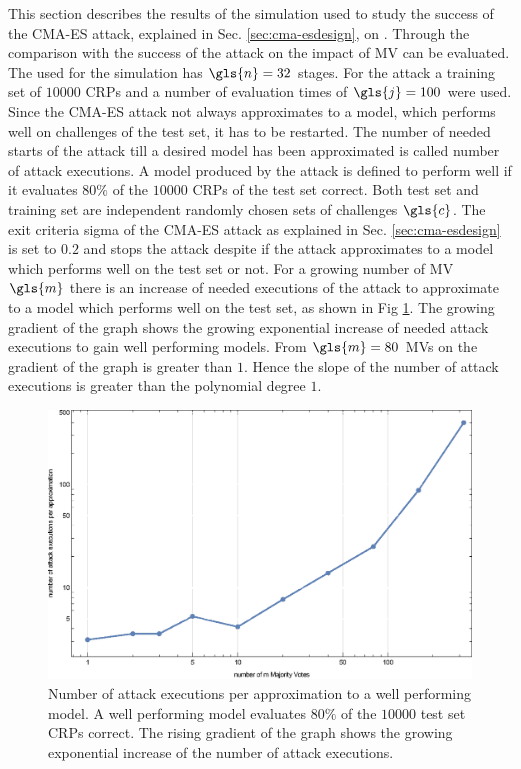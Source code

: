 This section describes the results of the simulation used to study the success of the \ac{CMA-ES} attack, explained in Sec. \ref{sec:cma-esdesign}, on \mpufs.
Through the comparison with the success of the attack on \apuf the impact of \ac{MV} can be evaluated.
The \apuf used for the simulation has $\gls{n} = 32$ stages.
For the attack a training set of $10000$ \acp{CRP} and a number of evaluation times of $\gls{j} = 100$ were used.
Since the \ac{CMA-ES} attack not always approximates to a model, which performs well on challenges of the test set, it has to be restarted.
The number of needed starts of the attack till a desired model has been approximated is called number of attack executions.
A model produced by the attack is defined to perform well if it evaluates $80 \%$ of the $10000$ \acp{CRP} of the test set correct.
Both test set and training set are independent randomly chosen sets of challenges $\gls{c}$.
The exit criteria sigma of the \ac{CMA-ES} attack as explained in Sec. \ref{sec:cma-esdesign} is set to $0.2$ and stops the attack despite if the attack approximates to a model which performs well on the test set or not.
For a growing number of \ac{MV} $\gls{m}$ there is an increase of needed executions of the attack to approximate to a model which performs well on the test set, as shown in Fig \ref{fig:cmasingleattackcorrelation}.
The growing gradient of the graph shows the growing exponential increase of needed attack executions to gain well performing models.
From $\gls{m} = 80$ \acp{MV} on the gradient of the graph is greater than $1$.
Hence the slope of the number of attack executions is greater than the polynomial degree $1$.

\begin{figure}[ht]
\includegraphics[width=1.00\textwidth]{images/single-mv-classification-cma-attack-correlation.eps}
\caption[Needed \acs{CMA-ES} attack executions for \mpufs]{Number of attack executions per approximation to a well performing model. A well performing model evaluates $80 \%$ of the $10000$ test set \acp{CRP} correct. The rising gradient of the graph shows the growing exponential increase of the number of attack executions.}
\label{fig:cmasingleattackcorrelation}
\end{figure}

